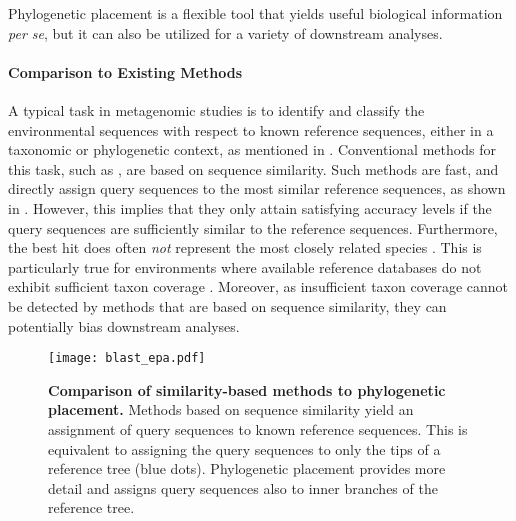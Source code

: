 Phylogenetic placement is a flexible tool that yields useful biological information \emph{per se},
but it can also be utilized for a variety of downstream analyses.

\paragraph{Comparison to Existing Methods}
\label{ch:Foundations:sec:PhylogeneticPlacement:sub:UseCasesApplications:par:Comparison}

A typical task in metagenomic studies is to identify and classify the environmental sequences with respect
to known reference sequences, either in a taxonomic or phylogenetic context,
as mentioned in .
Conventional methods for this task, such as  \cite{Altschul1990}, are based on sequence similarity.
Such methods are fast, and directly assign query sequences to the most similar reference sequences,
as shown in .
However, this implies that they only attain satisfying accuracy levels
if the query sequences are sufficiently similar to the reference sequences.
Furthermore, the best  hit does often \emph{not} represent the most closely related species \cite{Koski2001}.
This is particularly true for environments where available reference databases do not exhibit
sufficient taxon coverage \citep{Mahe2017}.
Moreover, as insufficient taxon coverage cannot be detected by methods that are based on sequence similarity,
they can potentially bias downstream analyses.

\begin{figure}[hpbt]
    \centering
    \texttt{[image: blast\_epa.pdf]}
    \begin{subfigure}{0pt}
        \label{fig:blast_epa:sub:blast}
    \end{subfigure}
    \begin{subfigure}{0pt}
        \label{fig:blast_epa:sub:epa}
    \end{subfigure}
    \caption[Comparison of similarity-based methods to phylogenetic placement]{
        \textbf{Comparison of similarity-based methods to phylogenetic placement.}
        Methods based on sequence similarity yield an assignment of query sequences to known reference sequences.
        This is equivalent to assigning the query sequences to only the tips of a reference tree (blue dots).
        Phylogenetic placement provides more detail
        and assigns query sequences also to inner branches of the reference tree.
    }
    \label{fig:blast_epa}
\end{figure}

